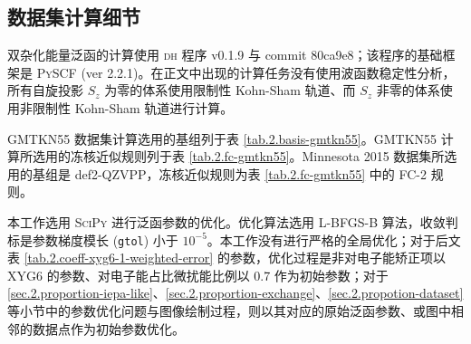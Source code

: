 \subsection{数据集计算细节}

双杂化能量泛函的计算使用 \textsc{dh} 程序 v0.1.9 与 commit 80ca9e8；该程序的基础框架是 \textsc{PySCF} (ver 2.2.1)。在正文中出现的计算任务没有使用波函数稳定性分析，所有自旋投影 $S_z$ 为零的体系使用限制性 Kohn-Sham 轨道、而 $S_z$ 非零的体系使用非限制性 Kohn-Sham 轨道进行计算。

GMTKN55 数据集计算选用的基组列于表 \ref{tab.2.basis-gmtkn55}。GMTKN55 计算所选用的冻核近似规则列于表 \ref{tab.2.fc-gmtkn55}。Minnesota 2015 数据集所选用的基组是 def2-QZVPP，冻核近似规则为表 \ref{tab.2.fc-gmtkn55} 中的 FC-2 规则。

本工作选用 \textsc{SciPy}\cite{Virtanen-Vazquez-Baeza.NM.2020} 进行泛函参数的优化。优化算法选用 L-BFGS-B 算法\cite{Byrd-Zhu.SJSC.1995}，收敛判标是参数梯度模长 (\verb|gtol|) 小于 $10^{-5}$。本工作没有进行严格的全局优化；对于后文表 \ref{tab.2.coeff-xyg6-1-weighted-error} 的参数，优化过程是非对电子能矫正项以 XYG6 的参数、对电子能占比微扰能比例以 0.7 作为初始参数；对于 \ref{sec.2.proportion-iepa-like}、\ref{sec.2.proportion-exchange}、\ref{sec.2.propotion-dataset} 等小节中的参数优化问题与图像绘制过程，则以其对应的原始泛函参数、或图中相邻的数据点作为初始参数优化。

\begin{table}[h]
\centering
\caption{GMTKN55 数据集计算所使用的基组}
\label{tab.2.basis-gmtkn55}
\end{table}

